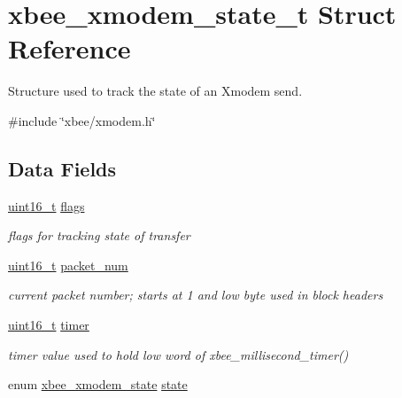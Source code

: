 \hypertarget{structxbee__xmodem__state__t}{\section{xbee\-\_\-xmodem\-\_\-state\-\_\-t Struct Reference}
\label{structxbee__xmodem__state__t}
}


Structure used to track the state of an Xmodem send.  




{\ttfamily \#include \char`\"{}xbee/xmodem.\-h\char`\"{}}

\subsection*{Data Fields}
\begin{DoxyCompactItemize}
\item 
\hypertarget{group__util__xmodem_ga1e87af3c18a2fd36c61faf89949bdc3f}{\hyperlink{group__hal_ga5a8b2dc9e45a9ee81a94ef304fb62505}{uint16\-\_\-t} \hyperlink{group__util__xmodem_ga1e87af3c18a2fd36c61faf89949bdc3f}{flags}}\label{group__util__xmodem_ga1e87af3c18a2fd36c61faf89949bdc3f}

\begin{DoxyCompactList}\small\item\em flags for tracking state of transfer \end{DoxyCompactList}\item 
\hypertarget{group__util__xmodem_ga59de4bab5575291b6b4ace70d7e50af5}{\hyperlink{group__hal_ga5a8b2dc9e45a9ee81a94ef304fb62505}{uint16\-\_\-t} \hyperlink{group__util__xmodem_ga59de4bab5575291b6b4ace70d7e50af5}{packet\-\_\-num}}\label{group__util__xmodem_ga59de4bab5575291b6b4ace70d7e50af5}

\begin{DoxyCompactList}\small\item\em current packet number; starts at 1 and low byte used in block headers \end{DoxyCompactList}\item 
\hypertarget{group__util__xmodem_gaea00c2c1dec6e8f58532f25c65210d9e}{\hyperlink{group__hal_ga5a8b2dc9e45a9ee81a94ef304fb62505}{uint16\-\_\-t} \hyperlink{group__util__xmodem_gaea00c2c1dec6e8f58532f25c65210d9e}{timer}}\label{group__util__xmodem_gaea00c2c1dec6e8f58532f25c65210d9e}

\begin{DoxyCompactList}\small\item\em timer value used to hold low word of xbee\-\_\-millisecond\-\_\-timer() \end{DoxyCompactList}\item 
\hypertarget{group__util__xmodem_ga73b81fc5d708360fbba38aee9bc2eac0}{enum \hyperlink{group__util__xmodem_gaca3fc49d80cd9afccc34812b2985484f}{xbee\-\_\-xmodem\-\_\-state} \hyperlink{group__util__xmodem_ga73b81fc5d708360fbba38aee9bc2eac0}{state}}\label{group__util__xmodem_ga73b81fc5d708360fbba38aee9bc2eac0}


\end{DoxyCompactItemize}
